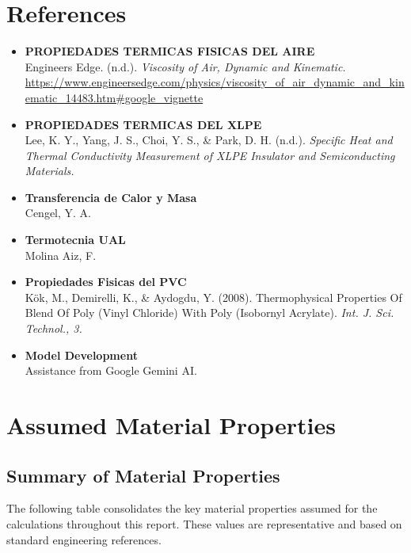 \documentclass[11pt, a4paper]{article}
\begin{document}
\newpage
\appendix
\section{References}

\begin{itemize}
    \item \textbf{PROPIEDADES TERMICAS FISICAS DEL AIRE} \\
    Engineers Edge. (n.d.). \textit{Viscosity of Air, Dynamic and Kinematic.} \\
    \url{https://www.engineersedge.com/physics/viscosity_of_air_dynamic_and_kinematic_14483.htm#google_vignette}

    \item \textbf{PROPIEDADES TERMICAS DEL XLPE} \\
    Lee, K. Y., Yang, J. S., Choi, Y. S., \& Park, D. H. (n.d.). \textit{Specific Heat and Thermal Conductivity Measurement of XLPE Insulator and Semiconducting Materials.}
    
    \item \textbf{Transferencia de Calor y Masa} \\
    Cengel, Y. A.
    
    \item \textbf{Termotecnia UAL} \\
    Molina Aiz, F.
    
    \item \textbf{Propiedades Fisicas del PVC} \\
    Kök, M., Demirelli, K., \& Aydogdu, Y. (2008). Thermophysical Properties Of Blend Of Poly (Vinyl Chloride) With Poly (Isobornyl Acrylate). \textit{Int. J. Sci. Technol., 3.}
    
    \item \textbf{Model Development} \\
    Assistance from Google Gemini AI.

\end{itemize}

\section{Assumed Material Properties}

\subsection{Summary of Material Properties}
The following table consolidates the key material properties assumed for the calculations throughout this report. These values are representative and based on standard engineering references.
\end{document}
